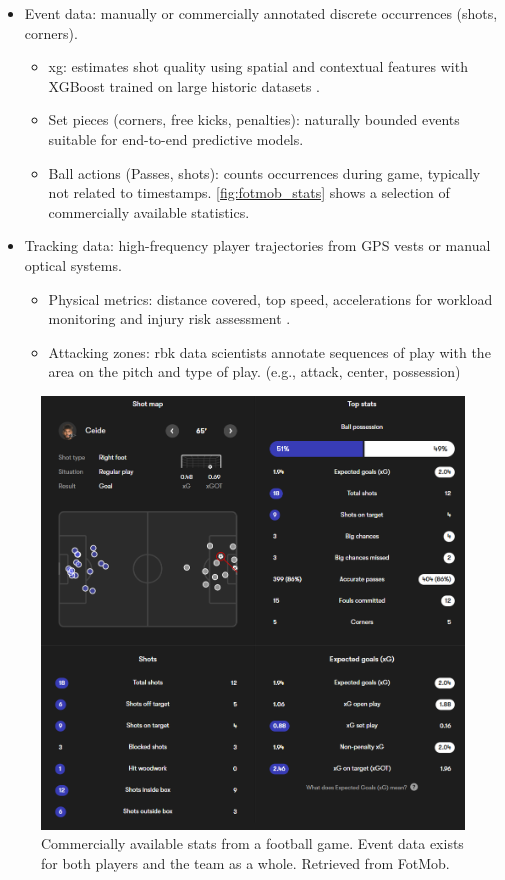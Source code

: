 \begin{itemize}
    \item Event data: manually or commercially annotated discrete occurrences (shots, corners).
    \begin{itemize}
        \item \acrfull{xg}: estimates shot quality using spatial and contextual features with XGBoost trained on large historic datasets \cite{mead_xg_2023}.
        \item Set pieces (corners, free kicks, penalties): naturally bounded events suitable for end-to-end predictive models.
        \item Ball actions (Passes, shots): counts occurrences during game, typically not related to timestamps. \autoref{fig:fotmob_stats} shows a selection of commercially available statistics. 
    \end{itemize}
    \item Tracking data: high-frequency player trajectories from GPS vests or manual optical systems.
    \begin{itemize}
        \item Physical metrics: distance covered, top speed, accelerations for workload monitoring and injury risk assessment \cite{hennessy_gps_tracker_2018}.
        \item Attacking zones: \acrfull{rbk} data scientists annotate sequences of play with the area on the pitch and type of play. (e.g., attack, center, possession)
    \end{itemize}
\end{itemize}

\begin{figure}[h]
    \centering
    \includegraphics[width=\linewidth]{figures/fotmob_rbk.png}
    \caption{Commercially available stats from a football game. Event data exists for both players and the team as a whole. Retrieved from FotMob\cite{fotmob_game}.}
    \label{fig:fotmob_stats}
\end{figure}

